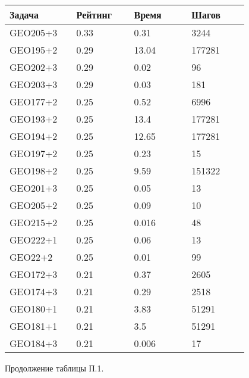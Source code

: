 \begin{longtable}[H]{|p{0.2\linewidth}|p{0.2\linewidth}|p{0.2\linewidth}|p{0.2\linewidth}|}
\hline
\textbf{Задача} & \textbf{Рейтинг} & \textbf{Время} & \textbf{Шагов} \\
\hline
GEO205+3 & 0.33 & 0.31 & 3244 \\
\hline
GEO195+2 & 0.29 & 13.04 & 177281 \\
\hline
GEO202+3 & 0.29 & 0.02 & 96 \\
\hline
GEO203+3 & 0.29 & 0.03 & 181 \\
\hline
GEO177+2 & 0.25 & 0.52 & 6996 \\
\hline
GEO193+2 & 0.25 & 13.4 & 177281 \\
\hline
GEO194+2 & 0.25 & 12.65 & 177281 \\
\hline
GEO197+2 & 0.25 & 0.23 & 15 \\
\hline
GEO198+2 & 0.25 & 9.59 & 151322 \\
\hline
GEO201+3 & 0.25 & 0.05 & 13 \\
\hline
GEO205+2 & 0.25 & 0.09 & 10 \\
\hline
GEO215+2 & 0.25 & 0.016 & 48 \\
\hline
GEO222+1 & 0.25 & 0.06 & 13 \\
\hline
GEO22+2 & 0.25 & 0.01 & 99 \\
\hline
GEO172+3 & 0.21 & 0.37 & 2605 \\
\hline
GEO174+3 & 0.21 & 0.29 & 2518 \\
\hline
GEO180+1 & 0.21 & 3.83 & 51291 \\
\hline
GEO181+1 & 0.21 & 3.5 & 51291 \\
\hline
GEO184+3 & 0.21 & 0.006 & 17 \\
\hline
\end{longtable}
\begin{center}
Продолжение таблицы П.1.
\end{center}

